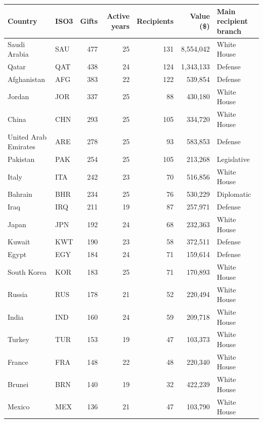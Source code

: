 \begin{tabular}{llrrrrl}
\toprule
Country & ISO3 & Gifts & Active years & Recipients & Value (\$) & Main recipient branch \\
\midrule
Saudi Arabia & SAU & 477 & 25 & 131 & 8,554,042 & White House \\
Qatar & QAT & 438 & 24 & 124 & 1,343,133 & Defense \\
Afghanistan & AFG & 383 & 22 & 122 & 539,854 & Defense \\
Jordan & JOR & 337 & 25 & 88 & 430,180 & White House \\
China & CHN & 293 & 25 & 105 & 334,720 & White House \\
United Arab Emirates & ARE & 278 & 25 & 93 & 583,853 & Defense \\
Pakistan & PAK & 254 & 25 & 105 & 213,268 & Legislative \\
Italy & ITA & 242 & 23 & 70 & 516,856 & White House \\
Bahrain & BHR & 234 & 25 & 76 & 530,229 & Diplomatic \\
Iraq & IRQ & 211 & 19 & 87 & 257,971 & Defense \\
Japan & JPN & 192 & 24 & 68 & 232,363 & White House \\
Kuwait & KWT & 190 & 23 & 58 & 372,511 & Defense \\
Egypt & EGY & 184 & 24 & 71 & 159,614 & Defense \\
South Korea & KOR & 183 & 25 & 71 & 170,893 & White House \\
Russia & RUS & 178 & 21 & 52 & 220,494 & White House \\
India & IND & 160 & 24 & 59 & 209,718 & White House \\
Turkey & TUR & 153 & 19 & 47 & 103,373 & White House \\
France & FRA & 148 & 22 & 48 & 220,340 & White House \\
Brunei & BRN & 140 & 19 & 32 & 422,239 & White House \\
Mexico & MEX & 136 & 21 & 47 & 103,790 & White House \\
\bottomrule
\end{tabular}
